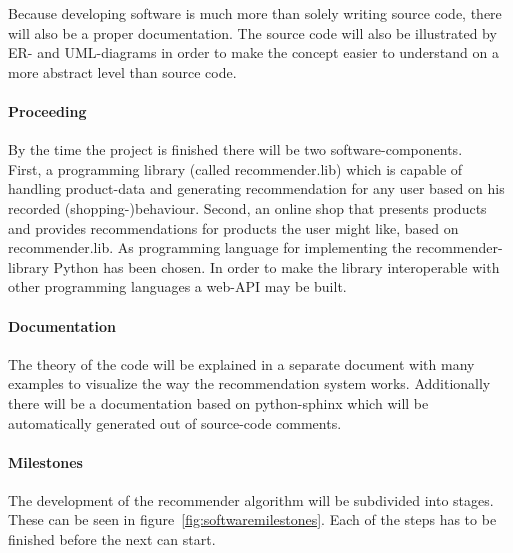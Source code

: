 Because developing software is much more than solely writing source code, there will also be a proper documentation.
The source code will also be illustrated by ER- and UML-diagrams in order to make the concept easier to understand on a more abstract level than source code.

\paragraph{Proceeding}
By the time the project is finished there will be two software-components.
\\
First, a programming library (called recommender.lib) which is capable of handling product-data and generating recommendation for any user based on his recorded (shopping-)behaviour.
Second, an online shop that presents products and provides recommendations for products the user might like, based on recommender.lib.
As programming language for implementing the recommender-library Python has been chosen.
In order to make the library interoperable with other programming languages a web-API may be built.

\paragraph{Documentation}
The theory of the code will be explained in a separate document with many examples to visualize the way the recommendation system works.
Additionally there will be a documentation based on python-sphinx which will be automatically generated out of source-code comments.

\paragraph{Milestones}
The development of the recommender algorithm will be subdivided into stages.
These can be seen in figure~\ref{fig:softwaremilestones}.
Each of the steps has to be finished before the next can start.
\\


